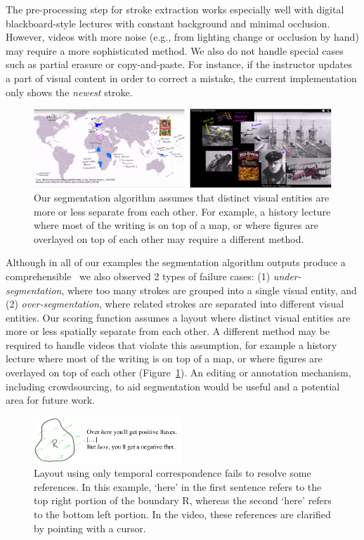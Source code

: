 The pre-processing step for stroke extraction works especially well with digital blackboard-style lectures with constant background and minimal occlusion. However, videos with more noise (e.g., from lighting change or occlusion by hand) may require a more sophisticated method. We also do not handle special cases
such as partial erasure or copy-and-paste.  For instance, if the instructor
updates a part of visual content in order to correct a mistake, the current
implementation only shows the \textit{newest} stroke.\\

\begin{figure}[h!]
        \centering
        \includegraphics[width=\textwidth]{figures/humanities_lec.pdf}
        \caption{Our segmentation algorithm assumes that distinct visual entities are more or less separate from each other. For example, a history lecture
where most of the writing is on top of a map, or where figures are overlayed
on top of each other may require a different method. }
        \label{fig:humanities_lec}
\end{figure}

Although in all of our examples the segmentation algorithm outputs produce a comprehensible \systemname\, we also observed 2 types of failure cases: (1) \textit{under-segmentation}, where too many strokes are grouped into a single visual entity, and (2) \textit{over-segmentation}, where related strokes are separated into different visual entities. Our scoring function assumes a layout where distinct visual entities are more or less spatially separate from each other. A different method may be required to handle videos that violate this assumption, for example a history lecture where most of the writing is on top of a map, or where figures are overlayed on top of each other (Figure~\ref{fig:humanities_lec}).  An editing or annotation mechanism, including crowdsourcing, to aid segmentation would be useful and a potential area for future work.\\

\begin{figure}[h!]
        \centering
        \includegraphics[width=2.2in]{figures/gesture.pdf}
        \caption{Layout using only temporal correspondence fails to resolve some references. In this example, `here' in the first sentence refers to the top right portion of the boundary R, whereas the second `here' refers to the bottom left portion. In the video, these references are clarified by pointing with a cursor.}
        \label{fig:gesture}
\end{figure}

